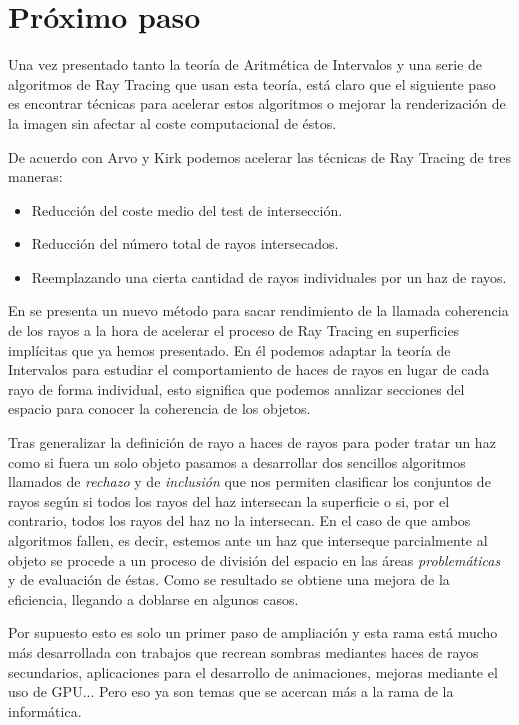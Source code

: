 \chapter{Próximo paso}

Una vez presentado tanto la teoría de Aritmética de Intervalos y una serie de algoritmos de Ray Tracing que usan esta teoría, está claro que el siguiente paso es encontrar técnicas para acelerar estos algoritmos o mejorar la renderización de la imagen sin afectar al coste computacional de éstos.

De acuerdo con Arvo y Kirk \cite{Arvo87} podemos acelerar las técnicas de Ray Tracing de tres maneras:
\begin{itemize}
\item Reducción del coste medio del test de intersección.
\item Reducción del número total de rayos intersecados.
\item Reemplazando una cierta cantidad de rayos individuales por un haz de rayos.
\end{itemize}

En \cite{Florez08} se presenta un nuevo método para sacar rendimiento de la llamada coherencia de los rayos a la hora de acelerar el proceso de Ray Tracing en superficies implícitas que ya hemos presentado. En él podemos adaptar la teoría de Intervalos para estudiar el comportamiento de haces de rayos en lugar de cada rayo de forma individual, esto significa que podemos analizar secciones del espacio para conocer la coherencia de los objetos.

Tras generalizar la definición de rayo a haces de rayos para poder tratar un haz como si fuera un solo objeto pasamos a desarrollar dos sencillos algoritmos llamados de{ \em rechazo} y de{ \em inclusión} que nos permiten clasificar los conjuntos de rayos según si todos los rayos del haz intersecan la superficie o si, por el contrario, todos los rayos del haz no la intersecan. En el caso de que ambos algoritmos fallen, es decir, estemos ante un haz que interseque parcialmente al objeto se procede a un proceso de división del espacio en las áreas{ \em problemáticas} y de evaluación de éstas. Como se resultado se obtiene una mejora de la eficiencia, llegando a doblarse en algunos casos.

Por supuesto esto es solo un primer paso de ampliación y esta rama está mucho más desarrollada con  trabajos que recrean sombras mediantes haces de rayos secundarios, aplicaciones para el desarrollo de animaciones, mejoras mediante el uso de GPU... Pero eso ya son temas que se acercan más a la rama de la informática.